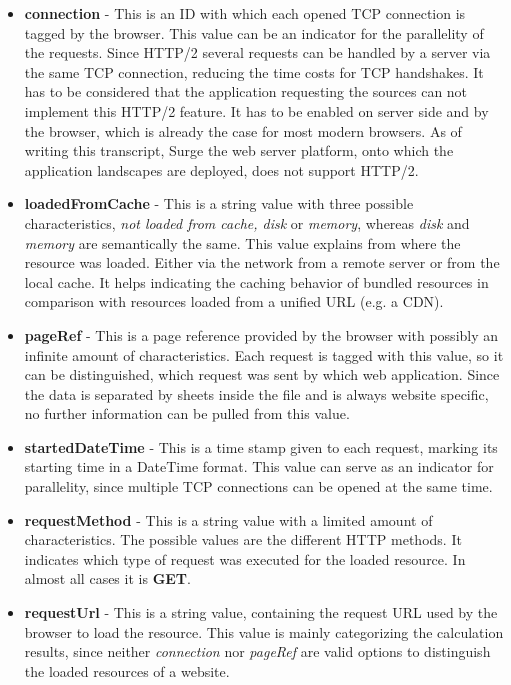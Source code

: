 \begin{itemize}
	\item \textbf{connection} - This is an ID with which each opened TCP connection is tagged by the browser. This value can be an indicator for the parallelity of the requests. Since HTTP/2 several requests can be handled by a server via the same TCP connection, reducing the time costs for TCP handshakes. It has to be considered that the application requesting the sources can not implement this HTTP/2 feature. It has to be enabled on server side and by the browser, which is already the case for most modern browsers.\cite{http2} As of writing this transcript, Surge the web server platform, onto which the application landscapes are deployed, does not support HTTP/2.
	
	\item \textbf{loadedFromCache} - This is a string value with three possible characteristics, \textit{not loaded from cache, disk} or \textit{memory}, whereas \textit{disk} and \textit{memory} are semantically the same. This value explains from where the resource was loaded. Either via the network from a remote server or from the local cache. It helps indicating the caching behavior of bundled resources in comparison with resources loaded from a unified URL (e.g. a CDN). 
	
	\item \textbf{pageRef} - This is a page reference provided by the browser with possibly an infinite amount of characteristics. Each request is tagged with this value, so it can be distinguished, which request was sent by which web application. Since the data is separated by sheets inside the file and is always website specific, no further information can be pulled from this value.
	
	\item \textbf{startedDateTime} - This is a time stamp given to each request, marking its starting time in a DateTime format. This value can serve as an indicator for parallelity, since multiple TCP connections can be opened at the same time. 
	
	\item \textbf{requestMethod} - This is a string value with a limited amount of characteristics. The possible values are the different HTTP methods. It indicates which type of request was executed for the loaded resource. In almost all cases it is \textbf{GET}.
	
	\item \textbf{requestUrl} - This is a string value, containing the request URL used by the browser to load the resource. This value is mainly categorizing the calculation results, since neither \textit{connection} nor \textit{pageRef} are valid options to distinguish the loaded resources of a website. 
	

\end{itemize}
